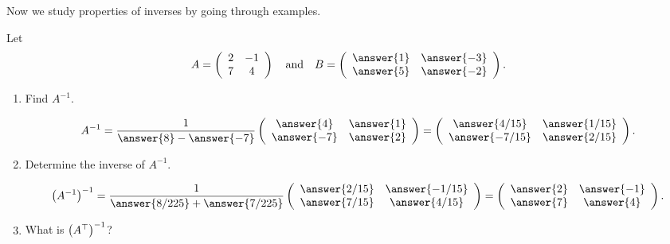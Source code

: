 \documentclass{ximera}
\begin{document}
Now we study properties of inverses by going through examples.
\begin{example}\label{example1}
  Let
  \[
    A= \left(
      \begin{array}{cc}
        2 &  -1  \\
        7&  4
      \end{array}
    \right)
    \quad\text{and}\quad
    B=
    \left(
      \begin{array}{cc}
        \answer{1} &  \answer{-3}  \\
        \answer{5}&  \answer{-2}
      \end{array}
    \right).
  \]

  \begin{enumerate}
  \item Find $A^{-1}$.
    \begin{prompt}
      \[
        A^{-1}=
        \frac{1}{\answer{8}- \answer{-7}}
        \left(
          \begin{array}{cc}
            \answer{4} &  \answer{1}  \\
            \answer{-7}&  \answer{2}
          \end{array}
        \right) =
        \left(
          \begin{array}{cc}
            \answer{4/15} &  \answer{1/15}  \\
            \answer{-7/15}&  \answer{2/15}
          \end{array}
        \right).
      \]
    \end{prompt}
  \item Determine the inverse of $A^{-1}$.
    \begin{prompt}
      \[
        \left(A^{-1}\right)^{-1}=
        \frac{1}{\answer{8/225} + \answer{7/225}} %
        \left(
          \begin{array}{cc}
            \answer{2/15} &  \answer{-1/15}  \\
            \answer{7/15}&  \answer{4/15}
          \end{array}
        \right) =
        \left(
          \begin{array}{cc}
            \answer{2} &  \answer{-1}  \\
            \answer{7}&  \answer{4}
          \end{array}
        \right).
      \]
    \end{prompt}
  \item What is $\left(A^\top\right)^{-1}$?

\end{enumerate}
\end{example}
\end{document}
